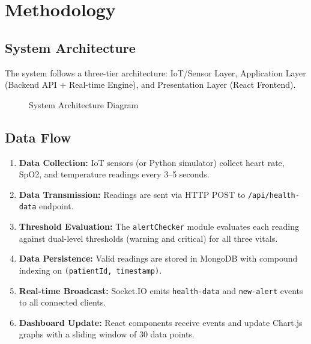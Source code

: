 \documentclass[12pt,a4paper]{report}
\begin{document}
\chapter{Methodology}

\section{System Architecture}
The system follows a three-tier architecture: IoT/Sensor Layer, Application Layer (Backend API + Real-time Engine), and Presentation Layer (React Frontend).

\begin{figure}[H]
\centering
{}
\caption{System Architecture Diagram}
\label{fig:architecture}
\end{figure}

\section{Data Flow}
\begin{enumerate}[leftmargin=*]
    \item \textbf{Data Collection:} IoT sensors (or Python simulator) collect heart rate, SpO2, and temperature readings every 3--5 seconds.
    \item \textbf{Data Transmission:} Readings are sent via HTTP POST to \texttt{/api/health-data} endpoint.
    \item \textbf{Threshold Evaluation:} The \texttt{alertChecker} module evaluates each reading against dual-level thresholds (warning and critical) for all three vitals.
    \item \textbf{Data Persistence:} Valid readings are stored in MongoDB with compound indexing on \texttt{(patientId, timestamp)}.
    \item \textbf{Real-time Broadcast:} Socket.IO emits \texttt{health-data} and \texttt{new-alert} events to all connected clients.
    \item \textbf{Dashboard Update:} React components receive events and update Chart.js graphs with a sliding window of 30 data points.
\end{enumerate}
\end{document}
